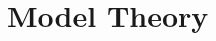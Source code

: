 \documentclass[open-logic-chapter]{subfiles}
\begin{document}
\chapter{Model Theory}









\OLEndChapterHook
\end{document}
